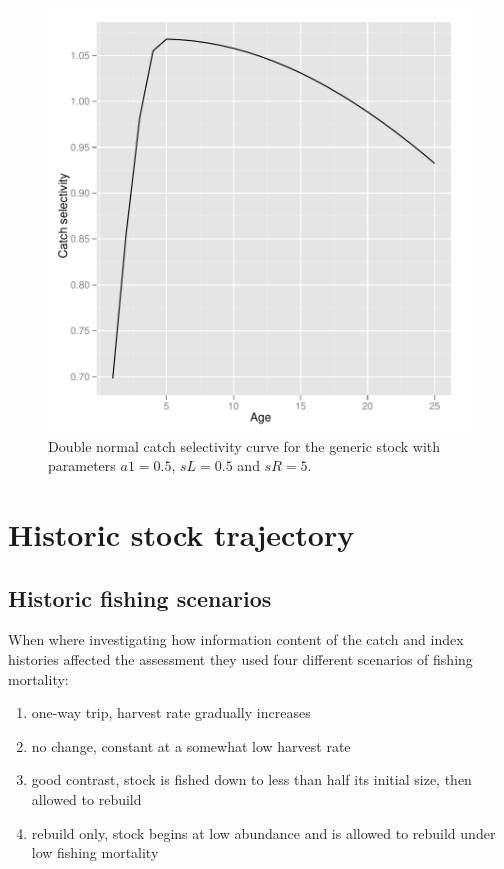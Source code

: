 \documentclass[a4paper]{article}
\begin{document}
\begin{figure}
\centering
\includegraphics{script-003}
\caption{Double normal catch selectivity curve for the generic stock with parameters $a1=0.5$, $sL=0.5$ and $sR=5$.}
\label{fig:generic_selectivity}
\end{figure}



\section{Historic stock trajectory}

\subsection{Historic fishing scenarios}

When \cite{Magnusson:2007} where investigating how information content
of the catch and index histories affected the assessment they used four different
scenarios of fishing mortality:

\begin{enumerate}
\item one-way trip, harvest rate gradually increases
\item no change, constant at a somewhat low harvest rate
\item good contrast, stock is fished down to less than half its initial size, then allowed to rebuild
\item rebuild only, stock begins at low abundance and is allowed to rebuild under low fishing mortality
\end{enumerate}
\end{document}
